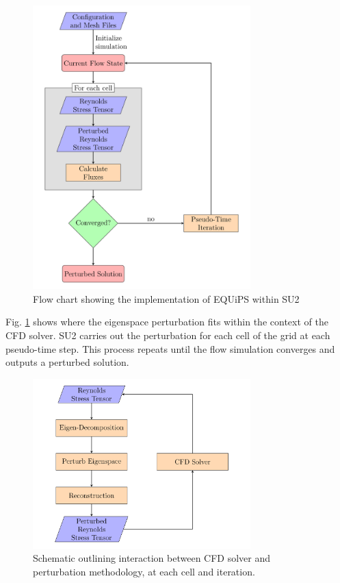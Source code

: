 \begin{figure}
\centering
\includegraphics[width=0.75\textwidth]{suthesis/images/su2_implmentation.png}
\caption{Flow chart showing the implementation of EQUiPS within SU2 \label{fig:equips_overview}}
\end{figure}

Fig. \ref{fig:equips_overview} shows where the eigenspace perturbation fits within the context of the CFD solver.
SU2 carries out the perturbation for each cell of the grid at each pseudo-time step.
This process repeats until the flow simulation converges and outputs a perturbed solution. 

\begin{figure}
\centering
\includegraphics[width=0.75\textwidth]{suthesis/images/eigenspace_pert.png}
\caption{Schematic outlining interaction between CFD solver and perturbation methodology, at each cell and iteration.\label{fig:perturbation_schematic}}
\end{figure}

